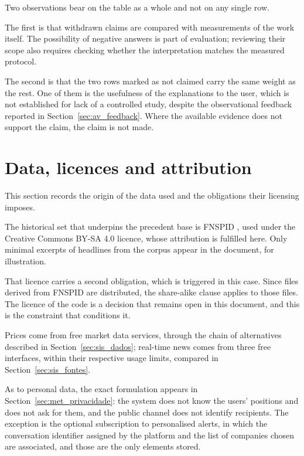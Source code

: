 Two observations bear on the table as a whole and not on any single row.

The first is that withdrawn claims are compared with measurements of the work itself. The
possibility of negative answers is part of evaluation; reviewing their scope also requires
checking whether the interpretation matches the measured protocol.

The second is that the two rows marked as not claimed carry the same weight as the rest. One of
them is the usefulness of the explanations to the user, which is not established for lack of a
controlled study, despite the observational feedback reported in Section~\ref{sec:av_feedback}.
Where the available evidence does not support the claim, the claim is not made.

\section{Data, licences and attribution}
\label{sec:ap_dados}

This section records the origin of the data used and the obligations their licensing imposes.

The historical set that underpins the precedent base is \gls{FNSPID}
\autocite{dong2024fnspid}, used under the Creative Commons BY-SA 4.0 licence, whose attribution is
fulfilled here. Only minimal excerpts of headlines from the corpus appear in the document, for
illustration.

That licence carries a second obligation, which is triggered in this case. Since files derived
from \gls{FNSPID} are distributed, the share-alike clause applies to those files. The
licence of the code is a decision that remains open in this document, and this is the constraint
that conditions it.

Prices come from free market data services, through the chain of alternatives described in
Section~\ref{sec:sis_dados}; real-time news comes from three free interfaces, within their
respective usage limits, compared in Section~\ref{sec:sis_fontes}.

As to personal data, the exact formulation appears in Section~\ref{sec:met_privacidade}: the
system does not know the users' positions and does not ask for them, and the public channel does
not identify recipients. The exception is the optional subscription to personalised alerts, in
which the conversation identifier assigned by the platform and the list of companies chosen are
associated, and those are the only elements stored.


